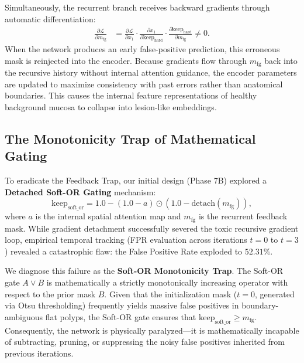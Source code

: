 Simultaneously, the recurrent branch receives backward gradients through
automatic differentiation:
\begin{align}
  \frac{\partial \mathcal{L}}{\partial m_{\text{fg}}}
    &= \frac{\partial \mathcal{L}}{\partial x_1}
       \cdot \frac{\partial x_1}{\partial \text{keep}_{\text{hard}}}
       \cdot \frac{\partial \text{keep}_{\text{hard}}}{\partial m_{\text{fg}}}
       \neq 0.
\end{align}
When the network produces an early false-positive prediction, this
erroneous mask is reinjected into the encoder. Because gradients flow
through $m_{\text{fg}}$ back into the recursive history without internal
attention guidance, the encoder parameters are updated to maximize
consistency with past errors rather than anatomical boundaries. This
causes the internal feature representations of healthy background mucosa
to collapse into lesion-like embeddings.

\subsection{The Monotonicity Trap of Mathematical Gating}
To eradicate the Feedback Trap, our initial design (Phase 7B) explored a \textbf{Detached Soft-OR Gating} mechanism:
\begin{equation}
  \text{keep}_{\text{soft\_or}} = 1.0 - (1.0 - a) \odot (1.0 - \text{detach}(m_{\text{fg}})),
\end{equation}
where $a$ is the internal spatial attention map and $m_{\text{fg}}$ is the recurrent feedback mask. While gradient detachment successfully severed the toxic recursive gradient loop, empirical temporal tracking (FPR evaluation across iterations $t=0$ to $t=3$) revealed a catastrophic flaw: the False Positive Rate exploded to $52.31\%$.

We diagnose this failure as the \textbf{Soft-OR Monotonicity Trap}. The Soft-OR gate $A \lor B$ is mathematically a strictly monotonically increasing operator with respect to the prior mask $B$. Given that the initialization mask ($t=0$, generated via Otsu thresholding) frequently yields massive false positives in boundary-ambiguous flat polyps, the Soft-OR gate ensures that $\text{keep}_{\text{soft\_or}} \ge m_{\text{fg}}$. 
Consequently, the network is physically paralyzed---it is mathematically incapable of subtracting, pruning, or suppressing the noisy false positives inherited from previous iterations.

